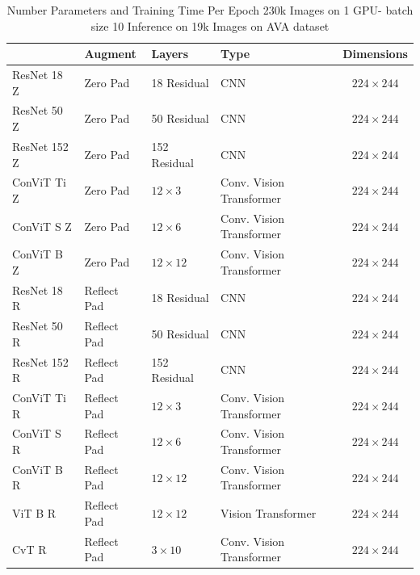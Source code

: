 \begin{table}[ht!]
\small 
    \centering
   \begin{tabular}{llllc}
\toprule
{}         & Augment             & Layers                    & Type            & Dimensions      \\
\midrule
ResNet 18  Z & Zero Pad      & 18 Residual    &  CNN                           & $224 \times 244$\\
ResNet 50  Z & Zero Pad      & 50 Residual    &  CNN                           & $224 \times 244$\\
ResNet 152 Z & Zero Pad      & 152 Residual   &  CNN                           & $224 \times 244$\\
ConViT Ti  Z & Zero Pad      & $12 \times 3$  & Conv. Vision Transformer       & $224 \times 244$\\
ConViT S   Z & Zero Pad      & $12 \times 6$  & Conv. Vision Transformer       & $224 \times 244$\\
ConViT B   Z & Zero Pad      & $12\times 12$  & Conv. Vision Transformer       & $224 \times 244$\\
ResNet 18  R & Reflect Pad   & 18 Residual    &  CNN                           & $224 \times 244$\\
ResNet 50  R & Reflect Pad   & 50 Residual    &  CNN                           & $224 \times 244$\\
ResNet 152 R & Reflect Pad   & 152 Residual   &  CNN                           & $224 \times 244$\\
ConViT Ti  R & Reflect Pad   & $12 \times 3$  & Conv. Vision Transformer       & $224 \times 244$\\
ConViT S   R & Reflect Pad   & $12 \times 6$  & Conv. Vision Transformer       & $224 \times 244$\\
ConViT B   R & Reflect Pad   & $12\times 12$  & Conv. Vision Transformer       & $224 \times 244$\\
ViT B      R & Reflect Pad   & $12\times 12$  & Vision Transformer             & $224 \times 244$\\
CvT        R & Reflect Pad   & $3\times 10$   & Conv. Vision Transformer       & $224 \times 244$\\
 
\bottomrule
\end{tabular}
    \caption{Number Parameters and Training Time Per Epoch 230k Images on 1 GPU- batch size 10 Inference on 19k Images on AVA dataset}
    \label{tab:Model Types}
\end{table}

